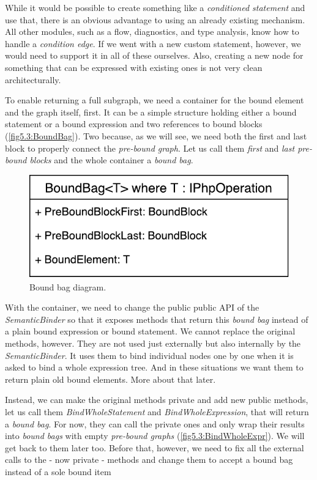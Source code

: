 While it would be possible to create something like a \emph{conditioned statement} and use that, there is an obvious advantage to using an already existing mechanism. All other modules, such as a flow, diagnostics, and type analysis, know how to handle a \emph{condition edge}. If we went with a new custom statement, however, we would need to support it in all of these ourselves. Also, creating a new node for something that can be expressed with existing ones is not very clean architecturally.

To enable returning a full subgraph, we need a container for the bound element and the graph itself, first. It can be a simple structure holding either a bound statement or a bound expression and two references to bound blocks (\autoref{fig5.3:BoundBag}). Two because, as we will see, we need both the first and last block to properly connect the \emph{pre-bound graph}. Let us call them \emph{first} and \emph{last pre-bound blocks} and the whole container a \emph{bound bag}.

\begin{figure}[H]
	\centering	
	\includegraphics[scale=0.75]{../img/5_3_BoundBag}	
	\caption{Bound bag diagram.}
	\label{fig5.3:BoundBag}
\end{figure}

With the container, we need to change the public public API of the \emph{SemanticBinder} so that it exposes methods that return this \emph{bound bag} instead of a plain bound expression or bound statement. We cannot replace the original methods, however. They are not used just externally but also internally by the \emph{SemanticBinder}. It uses them to bind individual nodes one by one when it is asked to bind a whole expression tree. And in these situations we want them to return plain old bound elements. More about that later.

Instead, we can make the original methods private and add new public methods, let us call them \emph{BindWholeStatement} and \emph{BindWholeExpression}, that will return a \emph{bound bag}. For now, they can call the private ones and only wrap their results into \emph{bound bags} with empty \emph{pre-bound graphs} (\autoref{fig5.3:BindWholeExpr}). We will get back to them later too. Before that, however, we need to fix all the external calls to the - now private - methods and change them to accept a bound bag instead of a sole bound item

